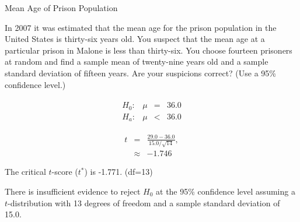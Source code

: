 \begin{frame}{Mean Age of Prison Population}

  In 2007 it was estimated that the mean age for the prison population
  in the United States is thirty-six years old. You suspect that the
  mean age at a particular prison in Malone is less than
  thirty-six. You choose fourteen prisoners at random and find a
  sample mean of twenty-nine years old and a {\color{red}sample standard deviation}
  of fifteen years. Are your suspicions correct? (Use a 95\%
  confidence level.)

  {
    \begin{eqnarray*}
      \begin{array}{lrcl}
        H_0: & \mu & = & 36.0 \\
        H_a: & \mu & < & 36.0
      \end{array}
    \end{eqnarray*}
  }

  {
    \begin{eqnarray*}
      t & = & \frac{29.0-36.0}{15.0/\sqrt{14}}, \\
      & \approx & -1.746
    \end{eqnarray*}
  }

  {
    The critical $t$-score ($t^*$) is -1.771. (df=13)
  }

  {

    {\color{red}
      There is insufficient evidence to reject $H_0$ at the 95\%
      confidence level assuming a $t$-distribution with 13 degrees of
      freedom and a {\color{red}sample standard deviation} of 15.0.
    }

  }

  
\end{frame}



